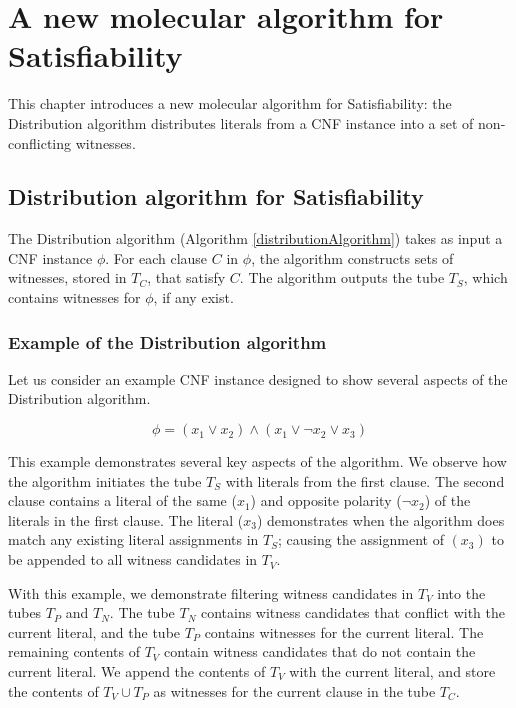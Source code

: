 
\chapter{A new molecular algorithm for {\sc Satisfiability}}

This chapter introduces a new molecular algorithm for {\sc Satisfiability}: the Distribution algorithm distributes literals from a CNF instance into a set of non-conflicting witnesses. 

\section{Distribution algorithm for {\sc Satisfiability}}


The Distribution algorithm (Algorithm \ref{distributionAlgorithm}) takes as input a CNF instance $\phi$.  For each clause $C$ in $\phi$, the algorithm constructs sets of witnesses, stored in $T_C$, that satisfy $C$.  The algorithm outputs the tube $T_S$, which contains witnesses for $\phi$, if any exist.


\FloatBarrier


	\subsection{Example of the Distribution algorithm}
	\label{exDistribution}

Let us consider an example CNF instance designed to show several aspects of the Distribution algorithm.


\[
	\phi = (x_1 \vee x_2) \wedge (x_1 \vee \neg x_2 \vee x_3)
\]


This example demonstrates several key aspects of the algorithm.  We observe how the algorithm initiates the tube $T_S$  with literals from the first clause.  The second clause contains a literal of the same ($x_1$) and opposite polarity ($\neg x_2$) of the literals in the first clause.  The literal ($x_3$) demonstrates when the algorithm does match any existing literal assignments in $T_S$; causing the assignment of $(x_3)$ to be appended to all witness candidates in $T_V$.

With this example, we demonstrate filtering witness candidates in $T_V$ into the tubes $T_P$ and $T_N$.  The tube $T_N$ contains witness candidates that conflict with the current literal, and the tube $T_P$ contains witnesses for the current literal.  The remaining contents of $T_V$ contain witness candidates that do not contain the current literal.  We append the contents of $T_V$ with the current literal, and store the contents of $T_V \cup T_P$ as witnesses for the current clause in the tube $T_C$.

